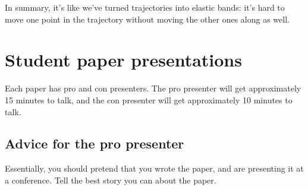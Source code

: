 \documentclass[twoside]{article}
\begin{document}
In summary, it's like we've turned trajectories into elastic bands: it's hard to move one point in the trajectory without moving the other ones along as well.

\section{Student paper presentations}
\label{sec:stud-paper-pres}

Each paper has pro and con presenters. The pro presenter will get approximately 15 minutes to talk, and the con presenter will get approximately 10 minutes to talk.

\subsection{Advice for the pro presenter}
\label{sec:advice-pro-presenter}

Essentially, you should pretend that you wrote the paper, and are presenting it at a conference. Tell the best story you can about the paper.
\end{document}
